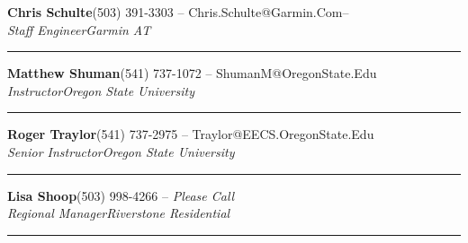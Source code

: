 \documentclass[margin, line]{res}
\newcommand{\ressubheading}[4]{
  \begin{minipage}{\textwidth}
  {\textbf{#1}\hfill #2} \\
  {\textit{#3}\hfill \textit{#4}}
  \end{minipage}
  \rule{\textwidth}{1pt}
  }
\begin{document}
    \ressubheading{Chris Schulte}
                  {(503) 391-3303 -- Chris.Schulte@Garmin.Com--}
                  {Staff Engineer}
                  {Garmin AT}

    \ressubheading{Matthew Shuman}
                  {(541) 737-1072 -- ShumanM@OregonState.Edu}
                  {Instructor}
                  {Oregon State University} 

    \ressubheading{Roger Traylor}
                  {(541) 737-2975 -- Traylor@EECS.OregonState.Edu}
                  {Senior Instructor}
                  {Oregon State University}

    \ressubheading{Lisa Shoop}
                  {(503) 998-4266 -- {\it Please Call}}
                  {Regional Manager}
                  {Riverstone Residential}
\end{document}
